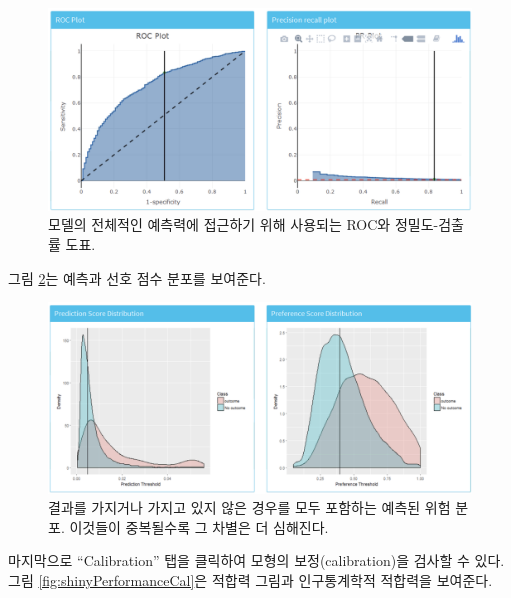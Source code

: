 \documentclass[11pt]{book}
\theoremstyle{definition}
\theoremstyle{definition}
\theoremstyle{definition}
\theoremstyle{remark}
\begin{document}
\begin{figure}

{\centering \includegraphics[width=1\linewidth]{images/PatientLevelPrediction/shiny/shinyPerformanceDisc} 

}

\caption{모델의 전체적인 예측력에 접근하기 위해 사용되는 ROC와 정밀도-검출률 도표.}\label{fig:shinyPerformanceDisc}
\end{figure}

그림 \ref{fig:shinyPerformanceDist}는 예측과 선호 점수 분포를 보여준다.

\begin{figure}

{\centering \includegraphics[width=1\linewidth]{images/PatientLevelPrediction/shiny/shinyPerformanceDist} 

}

\caption{결과를 가지거나 가지고 있지 않은 경우를 모두 포함하는 예측된 위험 분포. 이것들이 중복될수록 그 차별은 더 심해진다.}\label{fig:shinyPerformanceDist}
\end{figure}

마지막으로 ``Calibration'' 탭을 클릭하여 모형의 보정(calibration)을
검사할 수 있다. 그림 \ref{fig:shinyPerformanceCal}은 적합력 그림과
인구통계학적 적합력을 보여준다.
\end{document}
